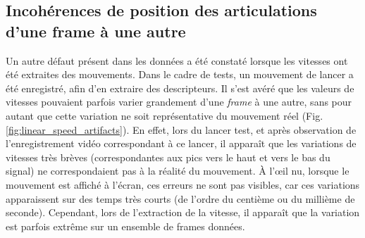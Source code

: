 \subsection{Incohérences de position des articulations d'une frame à une autre}

Un autre défaut présent dans les données a été constaté lorsque les vitesses ont été extraites des mouvements. Dans le cadre de tests, un mouvement de lancer a été enregistré, afin d'en extraire des descripteurs. Il s'est avéré que les valeurs de vitesses pouvaient parfois varier grandement d'une \textit{frame} à une autre, sans pour autant que cette variation ne soit représentative du mouvement réel (Fig. \ref{fig:linear_speed_artifacts}). En effet, lors du lancer test, et après observation de l'enregistrement vidéo correspondant à ce lancer, il apparaît que les variations de vitesses très brèves (correspondantes aux pics vers le haut et vers le bas du signal) ne correspondaient pas à la réalité du mouvement. À l'œil nu, lorsque le mouvement est affiché à l'écran, ces erreurs ne sont pas visibles, car ces variations apparaissent sur des temps très courts (de l'ordre du centième ou du millième de seconde). Cependant, lors de l'extraction de la vitesse, il apparaît que la variation est parfois extrême sur un ensemble de frames données.

